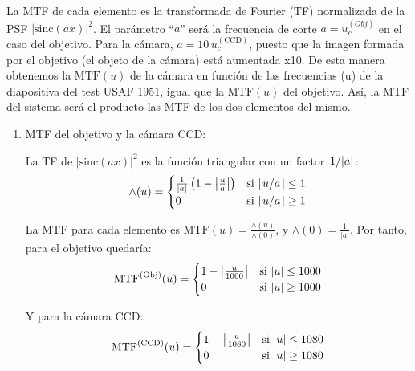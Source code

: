 \documentclass{./packages/optica-article}
\newcommand{\sinc}{\textrm{sinc}}
\newcommand\MTF{\textrm{MTF}}
\begin{document}
\begin{enumerate}
	      La MTF de cada elemento es la transformada de Fourier (TF) normalizada de la PSF $|\sinc(ax)|^2$. El parámetro ``$a$'' será la frecuencia de corte $a=u_c^{(Obj)}$ en el caso del objetivo. Para la cámara, $a=10\, u_c^{(\textrm{CCD})}$, puesto que la imagen formada por el objetivo (el objeto de la cámara) está aumentada x10. De esta manera obtenemos la $\MTF(u)$ de la cámara en función de las frecuencias (u) de la diapositiva del test USAF 1951, igual que la $\MTF(u)$ del objetivo. Así, la MTF del sistema será el producto las MTF de los dos elementos del mismo.

	      \begin{enumerate}
		      \item MTF del objetivo y la cámara CCD:

		            La TF de $|\sinc(ax)|^2$ es la función triangular con un factor $\flatfrac{1}{|a|}$:
		            \begin{equation}
			            \wedge(u)=
			            \begin{cases}
				            \frac{1}{|a|}\left(1-\abs{\frac{u}{a}}\right) & \textrm{si   $\abs{\flatfrac u a} \leq 1$} \\
				            0                                             & \textrm{si  $\abs{\flatfrac u a}  \geq 1$}
			            \end{cases}
		            \end{equation}

		            La MTF para cada elemento es $\MTF(u) = \frac{\wedge(u)}{\wedge(0)}$, y $\wedge(0) = \frac{1}{|a|}$. Por tanto, para el objetivo quedaría:
		            \begin{equation}
			            \MTF^{(\textrm{Obj})}(u)=
			            \begin{cases}
				            1-\abs{\frac{u}{1000}} & \textrm{si   $|u| \leq 1000$} \\
				            0                      & \textrm{si  $|u| \geq 1000$}
			            \end{cases}
		            \end{equation}

		            Y para la cámara CCD:
		            \begin{equation}
			            \MTF^{(\textrm{CCD})}(u)=
			            \begin{cases}
				            1-\abs{\frac{u}{1080}} & \textrm{si   $|u| \leq 1080$} \\
				            0                      & \textrm{si  $|u| \geq 1080$}
			            \end{cases}
		            \end{equation}


\end{enumerate}
\end{enumerate}
\end{document}
